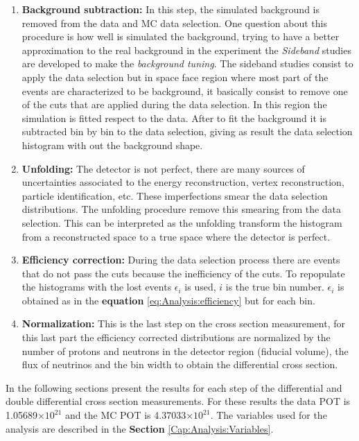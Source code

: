 \begin{enumerate}
    \item \textbf{Background subtraction:} In this step, the simulated background is removed from the data and MC data selection. One question about this procedure is how well is simulated the background, trying to have a better approximation to the real background in the experiment the \textit{Sideband} studies are developed to make the \textit{background tuning}. The sideband studies consist to apply the data selection but in space face region where most part of the events are characterized to be background, it basically consist to remove one of the cuts that are applied during the data selection. In this region the simulation is fitted respect to the data. After to fit the background it is subtracted bin by bin to the data selection, giving as result the data selection histogram with out the background shape. 

    \item \textbf{Unfolding:} The detector is not perfect, there are many sources of uncertainties associated to the energy reconstruction, vertex reconstruction, particle identification, etc. These imperfections smear the data selection distributions. The unfolding procedure remove this smearing from the data selection. This can be interpreted as the unfolding transform the histogram from a reconstructed space to a true space where the detector is perfect. 

    \item \textbf{Efficiency correction:} During the data selection process there are events that do not pass the cuts because the inefficiency of the cuts. To repopulate the histograms with the lost events $\epsilon_i$ is used, $i$ is the true bin number. $\epsilon_i$ is obtained as in the \textbf{equation} \ref{eq:Analysis:efficiency} but for each bin. 

    \item \textbf{Normalization:} This is the last step on the cross section measurement, for this last part the efficiency corrected distributions are normalized by the number of protons and neutrons in the detector region (fiducial volume), the flux of neutrinos and the bin width to obtain the differential cross section. 
    
\end{enumerate}

    In the following sections present the results for each step of the differential and double differential cross section measurements. For these results the data POT is 1.05689$\times 10^{21}$ and the MC POT is 4.37033$\times 10^{21}$.  The variables used for the analysis are described in the \textbf{Section} \ref{Cap:Analysis:Variables}.


